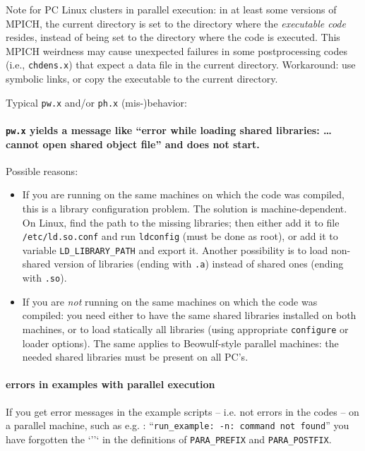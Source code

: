 \documentclass[12pt,a4paper]{article}
\begin{document}
Note for PC Linux clusters in parallel execution: in at least some 
versions of MPICH, the current directory is set to the directory where
the \emph{executable code} resides, instead of being set to the
directory where the code is executed.
This MPICH weirdness may cause unexpected failures in some
postprocessing codes (i.e., \texttt{chdens.x}) that expect a data file
in the current directory.
Workaround: use symbolic links, or copy the executable to the current
directory.

Typical \texttt{pw.x} and/or \texttt{ph.x} (mis-)behavior:

\paragraph{\texttt{pw.x} yields a message like ``error while loading
           shared libraries: \dots{} cannot open shared object file''
           and does not start.}

Possible reasons: 

\begin{itemize}
  \item
    If you are running on the same machines on which the code was
    compiled, this is a library configuration problem.
    The solution is machine-dependent.
    On Linux, find the path to the missing libraries; then either add
    it to file \texttt{/etc/ld.so.conf} and run \texttt{ldconfig}
    (must be done as root), or add it to variable
    \texttt{LD\_LIBRARY\_PATH} and export it.
    Another possibility is to load non-shared version of libraries
    (ending with \texttt{.a}) instead of shared ones (ending with
    \texttt{.so}).
  \item
    If you are \emph{not} running on the same machines on which the
    code was compiled: you need either to have the same shared
    libraries installed on both machines, or to load statically all
    libraries (using appropriate \texttt{configure} or loader options). 
    The same applies to Beowulf-style parallel machines: the needed 
    shared libraries must be present on all PC's.
\end{itemize}

\paragraph{errors in examples with parallel execution}

If you get error messages in the example scripts -- i.e. not errors
in the codes -- on a parallel  machine, such as e.g. :
``\texttt{run\_example: -n: command not found}''
you have forgotten the `''` in the definitions of 
\texttt{PARA\_PREFIX} and \texttt{PARA\_POSTFIX}.
\end{document}
